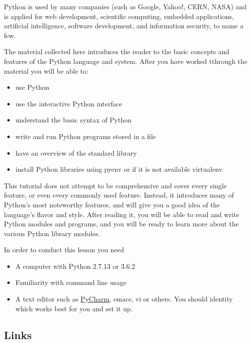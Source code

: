 Python is used by many companies (such as Google, Yahoo!, CERN, NASA)
and is applied for web development, scientific computing, embedded
applications, artificial intelligence, software development, and
information security, to name a few.

The material collected here introduces the reader to the basic concepts and
features of the Python language and system. After you have worked
tthrough the material you will be able to:

\begin{itemize}
\tightlist
\item
  use Python
\item
  use the interactive Python interface
\item
  understand the basic syntax of Python
\item
  write and run Python programs stored in a file
\item
  have an overview of the standard library
\item
  install Python libraries using pyenv or if it is not available
  virtualenv
\end{itemize}

This tutorial does not attempt to be comprehensive and cover every
single feature, or even every commonly used feature. Instead, it
introduces many of Python's most noteworthy features, and will give you
a good idea of the language's flavor and style. After reading it, you
will be able to read and write Python modules and programs, and you will
be ready to learn more about the various Python library modules.

In order to conduct this lesson you need

\begin{itemize}
\tightlist
\item
  A computer with Python 2.7.13 or 3.6.2
\item
  Familiarity with command line usage
\item
  A text editor such as
  \href{https://www.jetbrains.com/pycharm/}{PyCharm}, emacs, vi or
  others. You should identity which works best for you and set it up.
\end{itemize}

\subsection{Links}\label{links}

